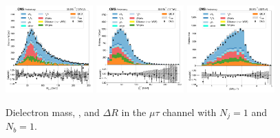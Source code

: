 \begin{figure}[htb!]
    \centering
    \includegraphics[width=0.3\textwidth]{chapters/Appendix/sectionPlots/figures/data_mc_overlays/mutau_2016_cat_eq1_eq1_signal_linear_lepton_dilepton1_mass}
    \includegraphics[width=0.3\textwidth]{chapters/Appendix/sectionPlots/figures/data_mc_overlays/mutau_2016_cat_eq1_eq1_signal_linear_lepton_dilepton1_pt}
    \includegraphics[width=0.3\textwidth]{chapters/Appendix/sectionPlots/figures/data_mc_overlays/mutau_2016_cat_eq1_eq1_signal_linear_lepton_dilepton1_delta_r}
    \caption{Dielectron mass, \pt, and $\Delta R$ in the $\mu\tau$ channel
    with $N_{j} = 1$ and $N_{b} = 1$.}
    \label{fig:mutau_3_dilepton}
\end{figure}

